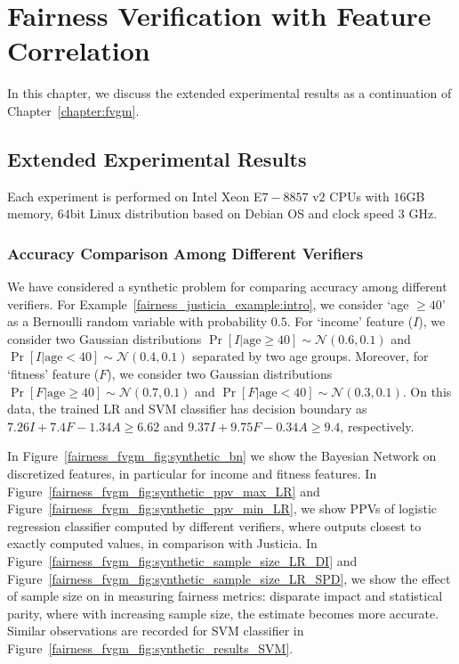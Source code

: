 \chapter{Fairness Verification with Feature Correlation}
	In this chapter, we discuss the extended experimental results as a continuation of Chapter~\ref{chapter:fvgm}.  


	\section{Extended Experimental Results}
	\label{fairness_fvgm_appendix:experiments}
	Each experiment is performed on Intel Xeon E$ 7-8857 $ v$2 $ CPUs with $ 16 $GB memory, $ 64 $bit Linux distribution based on Debian OS and clock speed $ 3 $ GHz.
	
	
	
		

	\subsection{Accuracy Comparison Among Different Verifiers}
	We have considered a synthetic problem for comparing accuracy among different verifiers. For Example~\ref{fairness_justicia_example:intro}, we consider `age $ \ge 40 $' as a Bernoulli random  variable with probability $ 0.5 $. For `income' feature ($ I $), we consider two Gaussian distributions $ \Pr[I | \text{age} \ge 40] \sim \mathcal{N}(0.6, 0.1) $ and $ \Pr[I | \text{age} < 40] \sim \mathcal{N}(0.4, 0.1) $ separated by two age groups. Moreover, for `fitness' feature ($ F $), we consider two Gaussian distributions $ \Pr[F | \text{age} \ge 40] \sim \mathcal{N}(0.7, 0.1) $ and $ \Pr[F | \text{age} < 40] \sim \mathcal{N}(0.3, 0.1) $. On this data, the trained LR and SVM classifier has decision boundary as $ 7.26I + 7.4F - 1.34A \ge 6.62 $ and $ 9.37I + 9.75F - 0.34A \ge 9.4 $, respectively.
	
	
	In Figure~\ref{fairness_fvgm_fig:synthetic_bn} we show the Bayesian Network on discretized features, in particular for income and fitness features. In Figure~\ref{fairness_fvgm_fig:synthetic_ppv_max_LR} and Figure~\ref{fairness_fvgm_fig:synthetic_ppv_min_LR}, we show PPVs of logistic regression classifier computed by different verifiers, where  {\fvgm} outputs closest to exactly computed values, in comparison with Justicia. In Figure~\ref{fairness_fvgm_fig:synthetic_sample_size_LR_DI} and Figure~\ref{fairness_fvgm_fig:synthetic_sample_size_LR_SPD}, we show the effect of sample size on {\fvgm} in measuring fairness metrics: disparate impact and statistical parity, where with increasing sample size, the estimate becomes more accurate. Similar observations are recorded for SVM classifier in Figure~\ref{fairness_fvgm_fig:synthetic_results_SVM}.
	

